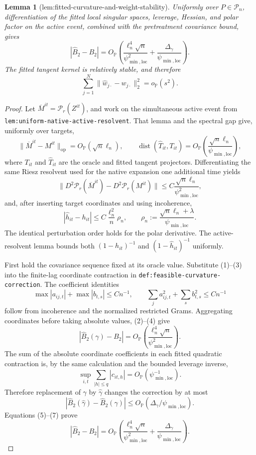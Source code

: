 \documentclass{article}
\newtheorem{lemma}{Lemma}
\begin{document}
\begin{lemma}[lem:fitted-curvature-and-weight-stability]\label{lem:fitted-curvature-and-weight-stability}
Uniformly over \(P\in\mathcal P_n\), differentiation of the fitted local singular spaces, leverage, Hessian, and polar factor on the active event, combined with the pretreatment covariance bound, gives
\[
 |\widehat B_2-B_2|=O_{\mathbb P}\!\left(
 \frac{\ell_n^4\sqrt n}{\psi_{\min,\mathrm{loc}}^2}
 +\frac{\Delta_\gamma}{\psi_{\min,\mathrm{loc}}}\right).
\]
The fitted tangent kernel is relatively stable, and therefore
\[
 \sum_{j=1}^N\|\widehat w_{j\cdot}-w_{j\cdot}\|_2^2
 =o_{\mathbb P}(s^2).
\]
\end{lemma}
\begin{proof}
Let \(\overline M^{it}=\mathcal P_r(Z^{it})\), and work on the simultaneous active event from \texttt{lem:uniform-native-active-resolvent}.  That lemma and the spectral gap give, uniformly over targets,
\[
 \|\overline M^{it}-M^{it}\|_{\mathrm{op}}
 =O_{\mathbb P}(\sqrt n\ell_n),
 \qquad
 \operatorname{dist}(\widehat T_{it},T_{it})
 =O_{\mathbb P}\!\left(
 \frac{\sqrt n\ell_n}{\psi_{\min,\mathrm{loc}}}\right),
 \tag{1}
\]
where \(T_{it}\) and \(\widehat T_{it}\) are the oracle and fitted tangent projectors.  Differentiating the same Riesz resolvent used for the native expansion one additional time yields
\[
 \|D^2\mathcal P_r(\overline M^{it})
       -D^2\mathcal P_r(M^{it})\|
 \le C\frac{\sqrt n\ell_n}{\psi_{\min,\mathrm{loc}}^2},
 \tag{2}
\]
and, after inserting target coordinates and using incoherence,
\[
 |\widehat h_{it}-h_{it}|
 \le C\frac{\ell_n^2}{n}\rho_n,
 \qquad
 \rho_n:=\frac{\sqrt n\ell_n+\lambda}{\psi_{\min,\mathrm{loc}}}.
 \tag{3}
\]
The identical perturbation order holds for the polar derivative.  The active-resolvent lemma bounds both \((1-h_{it})^{-1}\) and \((1-\widehat h_{it})^{-1}\) uniformly.

First hold the covariance sequence fixed at its oracle value.  Substitute (1)--(3) into the finite-lag coordinate contraction in \texttt{def:feasible-curvature-correction}.  The coefficient identities
\[
 \max|a_{ij,t}|+\max|b_{t,s}|\le Cn^{-1},
 \qquad
 \sum_j a_{ij,t}^2+\sum_s b_{t,s}^2\le Cn^{-1}
 \tag{4}
\]
follow from incoherence and the normalized restricted Grams.  Aggregating coordinates before taking absolute values, (2)--(4) give
\[
 |\widehat B_2(\gamma)-B_2|
 =O_{\mathbb P}\!\left(
 \frac{\ell_n^4\sqrt n}{\psi_{\min,\mathrm{loc}}^2}\right).
 \tag{5}
\]
The sum of the absolute coordinate coefficients in each fitted quadratic contraction is, by the same calculation and the bounded leverage inverse,
\[
 \sup_{i,t}\sum_{|h|\le q}|c_{it,h}|
 =O_{\mathbb P}(\psi_{\min,\mathrm{loc}}^{-1}).
 \tag{6}
\]
Therefore replacement of \(\gamma\) by \(\widehat\gamma\) changes the correction by at most
\[
 |\widehat B_2(\widehat\gamma)-\widehat B_2(\gamma)|
 \le O_{\mathbb P}(\Delta_\gamma/\psi_{\min,\mathrm{loc}}).
 \tag{7}
\]
Equations (5)--(7) prove
\[
 |\widehat B_2-B_2|=O_{\mathbb P}\!\left(
 \frac{\ell_n^4\sqrt n}{\psi_{\min,\mathrm{loc}}^2}
 +\frac{\Delta_\gamma}{\psi_{\min,\mathrm{loc}}}\right).
 \tag{8}
\]


\end{proof}
\end{document}
